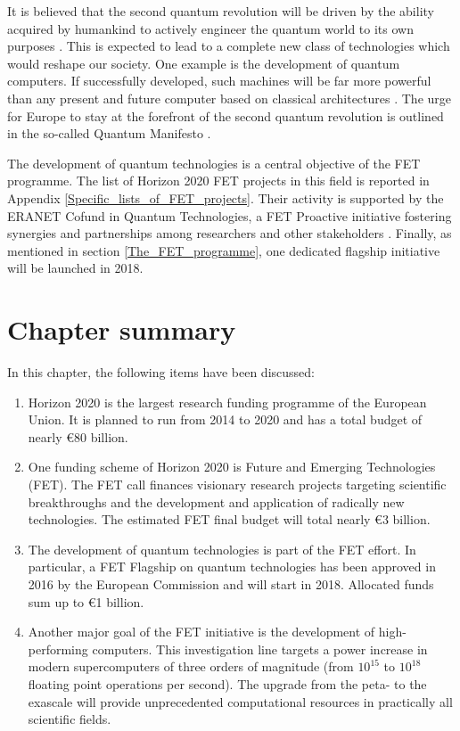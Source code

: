 It is believed that the second quantum revolution will be driven by the ability acquired by humankind to actively engineer the quantum world to its own purposes \cite{Dowling}. This is expected to lead to a complete new class of technologies which would reshape our society. One example is the development of quantum computers. If successfully developed, such machines will be far more powerful than any present and future computer based on classical architectures \cite{Rieffel}. The urge for Europe to stay at the forefront of the second quantum revolution is outlined in the so-called Quantum Manifesto \cite{QuantumManifesto}.

The development of quantum technologies is a central objective of the FET programme.  The list of Horizon 2020 FET projects in this field is reported in Appendix \ref{Specific_lists_of_FET_projects}. Their activity is supported by the ERANET Cofund in Quantum Technologies, a FET Proactive initiative fostering synergies and partnerships among researchers and other stakeholders \cite{ERANET}. Finally, as mentioned in section \ref{The_FET_programme}, one dedicated flagship initiative will be launched in 2018. 

\section{Chapter summary} 
In this chapter, the following items have been discussed:

\begin{enumerate}
 \item Horizon 2020 is the largest research funding programme of the European Union. It is planned to run from 2014 to 2020 and has a total budget of nearly \euro 80 billion. 
 \item One funding scheme of Horizon 2020 is Future and Emerging Technologies (FET). The FET call finances visionary research projects targeting scientific breakthroughs and the development and application of radically new technologies. The estimated FET final budget will total nearly \euro 3 billion. 
 \item The development of quantum technologies is part of the FET effort. In particular, a FET Flagship on quantum technologies has been approved in 2016 by the European Commission and will start in 2018. Allocated funds sum up to \euro 1 billion. 
 \item Another major goal of the FET initiative is the development of high-performing computers. This investigation line targets a power increase in modern supercomputers of three orders of magnitude (from $10^{15}$ to $10^{18}$ floating point operations per second). The upgrade from the peta- to the exascale will provide unprecedented computational resources in practically all scientific fields.    
\end{enumerate}
